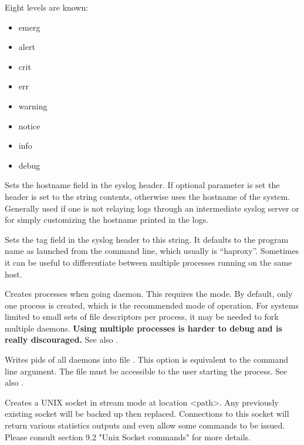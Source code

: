 \begin{keywords}
Eight levels are known:
\begin{multicols}{4}\begin{itemize}
	\item emerg  \item alert  \item crit   \item err    \item warning \item notice \item info  \item debug
\end{itemize}\end{multicols}

 

  Sets the hostname field in the syslog header. If optional  parameter
  is set the header is set to the string contents, otherwise uses the hostname
  of the system. Generally used if one is not relaying logs through an
  intermediate syslog server or for simply customizing the hostname printed in
  the logs.

 

  Sets the tag field in the syslog header to this string. It defaults to the
  program name as launched from the command line, which usually is ``haproxy''.
  Sometimes it can be useful to differentiate between multiple processes
  running on the same host.

 

  Creates  processes when going daemon. This requires the 
  mode. By default, only one process is created, which is the recommended mode
  of operation. For systems limited to small sets of file descriptors per
  process, it may be needed to fork multiple daemons. 
  \textbf{Using multiple processes is harder to debug and is really discouraged.}
  See also .

 

  Writes pids of all daemons into file . This option is equivalent to
  the  command line argument. The file must be accessible to the user
  starting the process. See also .

  

  Creates a UNIX socket in stream mode at location <path>. Any previously
  existing socket will be backed up then replaced. Connections to this socket
  will return various statistics outputs and even allow some commands to be
  issued. Please consult section 9.2 "Unix Socket commands" for more details.


\end{keywords}
